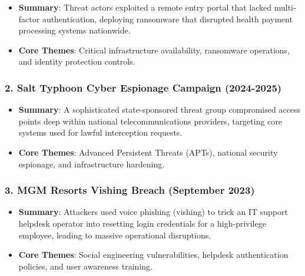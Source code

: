 \documentclass[12pt,openany]{book}
\begin{document}
\begin{itemize}

  \item \textbf{Summary}: Threat actors exploited a remote entry portal that lacked multi-factor authentication, deploying ransomware that disrupted health payment processing systems nationwide.

  \item \textbf{Core Themes}: Critical infrastructure availability, ransomware operations, and identity protection controls.

\end{itemize}


\subsubsection*{2. Salt Typhoon Cyber Espionage Campaign (2024-2025)}


\begin{itemize}

  \item \textbf{Summary}: A sophisticated state-sponsored threat group compromised access points deep within national telecommunications providers, targeting core systems used for lawful interception requests.

  \item \textbf{Core Themes}: Advanced Persistent Threats (APTs), national security espionage, and infrastructure hardening.

\end{itemize}


\subsubsection*{3. MGM Resorts Vishing Breach (September 2023)}


\begin{itemize}

  \item \textbf{Summary}: Attackers used voice phishing (vishing) to trick an IT support helpdesk operator into resetting login credentials for a high-privilege employee, leading to massive operational disruptions.

  \item \textbf{Core Themes}: Social engineering vulnerabilities, helpdesk authentication policies, and user awareness training.

\end{itemize}
\end{document}
